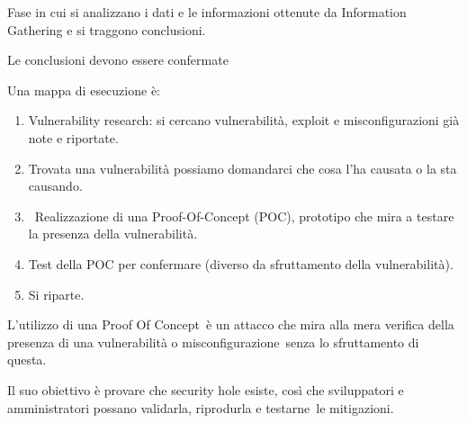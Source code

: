 \documentclass[
]{article}
\providecommand{\tightlist}{%
  \setlength{\itemsep}{0pt}\setlength{\parskip}{0pt}}
\begin{document}
{Fase in cui si analizzano i dati e le informazioni ottenute da
Information Gathering e si traggono conclusioni. }

{Le conclusioni devono essere confermate}

{}

{Una mappa di esecuzione è:}

\begin{enumerate}
\tightlist
\item
  {Vulnerability research}{: si cercano vulnerabilità, exploit e
  misconfigurazioni già note e riportate.}
\end{enumerate}

{}

\begin{enumerate}
\setcounter{enumi}{1}
\tightlist
\item
  {Trovata una vulnerabilità possiamo domandarci che }{cosa l'ha causata
  o la sta causando}{.}
\end{enumerate}

{}

\begin{enumerate}
\setcounter{enumi}{2}
\tightlist
\item
  {~Realizzazione di una }{Proof-Of-Concept (POC)}{, prototipo che mira
  a testare la presenza della vulnerabilità. }
\end{enumerate}

{}

\begin{enumerate}
\setcounter{enumi}{3}
\tightlist
\item
  {Test }{della POC per confermare (diverso da sfruttamento della
  vulnerabilità).}
\end{enumerate}

{}

\begin{enumerate}
\setcounter{enumi}{4}
\tightlist
\item
  {Si riparte.}
\end{enumerate}

{}

{L'utilizzo di una }{Proof Of Concept}{~è un attacco che mira alla mera
verifica della presenza di una vulnerabilità o
}{misconfigurazione}{~senza lo sfruttamento di questa.}

{}

{Il suo obiettivo è }{provare che security hole esiste, così che
sviluppatori e amministratori possano validarla, riprodurla e
}{testarne}{~le mitigazioni.}
\end{document}
